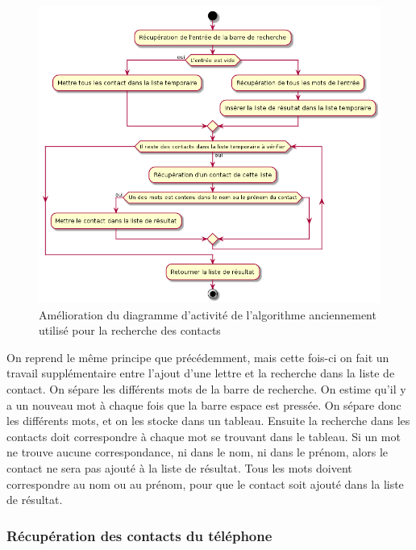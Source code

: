 \begin{figure}[!h]
	\centering
	\includegraphics[scale=0.6]{img/activity_retrieve_better.png}
	\caption{\label{activity_retrieve_better} {Amélioration du diagramme d'activité de l'algorithme anciennement utilisé pour la recherche des contacts}}
\end{figure}

On reprend le même principe que précédemment, mais cette fois-ci on fait un travail supplémentaire entre l'ajout d'une lettre et la recherche dans la liste de contact. On sépare les différents mots de la barre de recherche. On estime qu'il y a un nouveau mot à chaque fois que la barre espace est pressée. On sépare donc les différents mots, et on les stocke dans un tableau. Ensuite la recherche dans les contacts doit correspondre à chaque mot se trouvant dans le tableau. Si un mot ne trouve aucune correspondance, ni dans le nom, ni dans le prénom, alors le contact ne sera pas ajouté à la liste de résultat. Tous les mots doivent correspondre au nom ou au prénom, pour que le contact soit ajouté dans la liste de résultat.

\newpage

\subsubsection{Récupération des contacts du téléphone}

